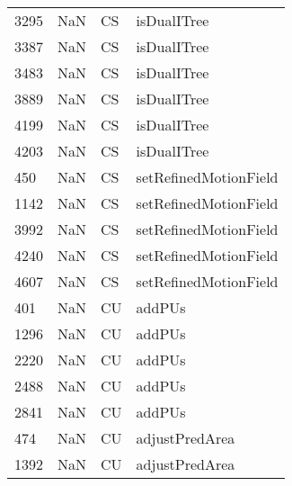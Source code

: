 \begin{tabular}{llll}
3295 &                   NaN &                         CS &                               isDualITree \\
3387 &                   NaN &                         CS &                               isDualITree \\
3483 &                   NaN &                         CS &                               isDualITree \\
3889 &                   NaN &                         CS &                               isDualITree \\
4199 &                   NaN &                         CS &                               isDualITree \\
4203 &                   NaN &                         CS &                               isDualITree \\
450  &                   NaN &                         CS &                     setRefinedMotionField \\
1142 &                   NaN &                         CS &                     setRefinedMotionField \\
3992 &                   NaN &                         CS &                     setRefinedMotionField \\
4240 &                   NaN &                         CS &                     setRefinedMotionField \\
4607 &                   NaN &                         CS &                     setRefinedMotionField \\
401  &                   NaN &                         CU &                                    addPUs \\
1296 &                   NaN &                         CU &                                    addPUs \\
2220 &                   NaN &                         CU &                                    addPUs \\
2488 &                   NaN &                         CU &                                    addPUs \\
2841 &                   NaN &                         CU &                                    addPUs \\
474  &                   NaN &                         CU &                            adjustPredArea \\
1392 &                   NaN &                         CU &                            adjustPredArea \\

\end{tabular}
